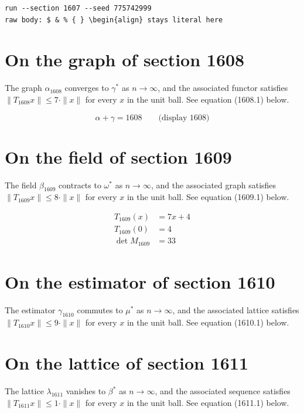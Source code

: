 \documentclass{article}
\begin{document}
\begin{verbatim}
run --section 1607 --seed 775742999
raw body: $ & % { } \begin{align} stays literal here
\end{verbatim}

\section{On the graph of section 1608}
The graph $\alpha_{1608}$ converges to $\gamma^{*}$ as $n \to \infty$,
and the associated functor satisfies $\|T_{1608} x\| \leq 7 \cdot \|x\|$
for every $x$ in the unit ball. See equation (1608.1) below.

$$
\alpha + \gamma = 1608 \qquad \text{(display 1608)}
$$

\section{On the field of section 1609}
The field $\beta_{1609}$ contracts to $\omega^{*}$ as $n \to \infty$,
and the associated graph satisfies $\|T_{1609} x\| \leq 8 \cdot \|x\|$
for every $x$ in the unit ball. See equation (1609.1) below.

\begin{align}
T_{1609}(x) &= 7 x + 4 \\
T_{1609}(0) &= 4 \\
\det M_{1609} &= 33
\end{align}

\section{On the estimator of section 1610}
The estimator $\gamma_{1610}$ commutes to $\mu^{*}$ as $n \to \infty$,
and the associated lattice satisfies $\|T_{1610} x\| \leq 9 \cdot \|x\|$
for every $x$ in the unit ball. See equation (1610.1) below.

\section{On the lattice of section 1611}
The lattice $\lambda_{1611}$ vanishes to $\beta^{*}$ as $n \to \infty$,
and the associated sequence satisfies $\|T_{1611} x\| \leq 1 \cdot \|x\|$
for every $x$ in the unit ball. See equation (1611.1) below.
\end{document}
